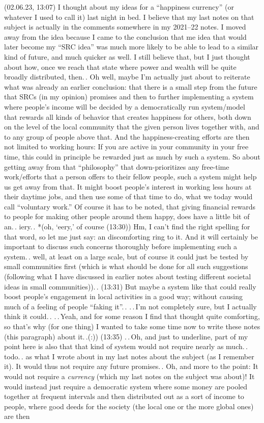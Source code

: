 \documentclass{report}
\begin{document}
(02.06.23, 13:07) I thought about my ideas for a ``happiness currency'' (or whatever I used to call it) last night in bed. I believe that my last notes on that subject is actually in the comments somewhere in my 2021--22 notes. I moved away from the idea because I came to the conclusion that me idea that would later become my ``SRC idea'' was much more likely to be able to lead to a similar kind of future, and much quicker as well. I still believe that, but I just thought about how, once we reach that state where power and wealth will be quite broadly distributed, then.\,. Oh well, maybe I'm actually just about to reiterate what was already an earlier conclusion: that there is a small step from the future that SRCs (in my opinion) promises and then to further implementing a system where people's income will be decided by a democratically run system/model that rewards all kinds of behavior that creates happiness for others, both down on the level of the local community that the given person lives together with, and to any group of people above that. And the happiness-creating efforts are then not limited to working hours: If you are active in your community in your free time, this could in principle be rewarded just as much by such a system. So about getting away from that ``philosophy'' that down-prioritizes any free-time work/efforts that a person offers to their fellow people, such a system might help us get away from that. It might boost people's interest in working less hours at their daytime jobs, and then use some of that time to do, what we today would call ``voluntary work.'' Of course it has to be noted, that giving financial rewards to people for making other people around them happy, does have a little bit of an.\,. iery.\,. *(oh, `eery,' of course (13:30)) Hm, I can't find the right spelling for that word, so let me just say: an discomforting ring to it. And it will certainly be important to discuss such concerns thoroughly before implementing such a system.\,. well, at least on a large scale, but of course it could just be tested by small communities first (which is what should be done for all such suggestions (following what I have discussed in earlier notes about testing different societal ideas in small communities)).\,. (13:31) But maybe a system like that could really boost people's engagement in local activities in a good way; without causing much of a feeling of people ``faking it''.\,. .\,.\,I'm not completely sure, but I actually think it could.\,. .\,.\,Yeah, and for some reason I find that thought quite comforting, so that's why (for one thing) I wanted to take some time now to write these notes (this paragraph) about it.\,.(:)) (13:35) .\,.\,Oh, and just to underline, part of my point here is also that that kind of system would not require nearly as much.\,. todo.\,. as what I wrote about in my last notes about the subject (as I remember it). It would thus not require any future promises.\,. Oh, and more to the point: It would not require a \emph{currency} (which my last notes on the subject was about)! It would instead just require a democratic system where some money are pooled together at frequent intervals and then distributed out as a sort of income to people, where good deeds for the society (the local one or the more global ones) are then 
\end{document}

